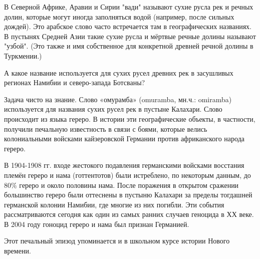 
В Северной Африке, Аравии и Сирии "вади" называют сухие русла рек и речных долин, которые могут иногда заполняться водой (например, после сильных дождей). Это арабское слово часто встречается там в географических названиях. В пустынях Средней Азии такие сухие русла и мёртвые речные долины называют "узбой". (Это также и имя собственное для конкретной древней речной долины в Туркмении.)

А какое название используется для сухих русел древних рек в засушливых регионах Намибии и северо-запада Ботсваны?

\explanationSection

Задача чисто на знание. Слово «омурамба» (omuramba, мн.ч.: omiramba) используется для названия сухих русел рек в пустыне Калахари. Слово происходит из языка гереро. В истории эти географические объекты, в частности, получили печальную известность в связи с боями, которые велись колониальными войсками кайзеровской Германии против африканского народа гереро.

В 1904-1908 гг. входе жестокого подавления германскими войсками восстания племён гереро и нама (готтентотов) были истреблено, по некоторым данным, до 80\% гереро и около половины нама. После поражения в открытом сражении большинство гереро были оттеснены в пустыню Калахари за пределы тогдашней германской колонии Намибии, где многие из них погибли. Эти события рассматриваются сегодня как один из самых ранних случаев геноцида в ХХ веке. В 2004 году гоноцид гереро и нама был признан Германией.

Этот печальный эпизод упоминается и в школьном курсе истории Нового времени.
